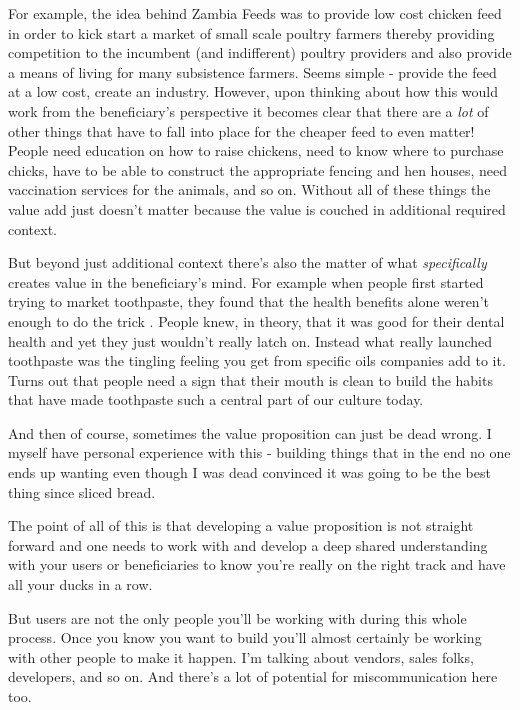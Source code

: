 \documentclass[11pt]{book}
\begin{document}
For example, the idea behind Zambia Feeds \cite{macmillan} was to provide low cost chicken feed in order to kick start a market of small scale poultry farmers thereby providing competition to the incumbent (and indifferent) poultry providers and also provide a means of living for many subsistence farmers. Seems simple - provide the feed at a low cost, create an industry. However, upon thinking about how this would work from the beneficiary's perspective it becomes clear that there are a \textit{lot} of other things that have to fall into place for the cheaper feed to even matter! People need education on how to raise chickens, need to know where to purchase chicks, have to be able to construct the appropriate fencing and hen houses, need vaccination services for the animals, and so on. Without all of these things the value add just doesn't matter because the value is couched in additional required context. 
\newline

But beyond just additional context there's also the matter of what \textit{specifically} creates value in the beneficiary's mind. For example when people first started trying to market toothpaste, they found that the health benefits alone weren't enough to do the trick \cite{duhigg}. People knew, in theory, that it was good for their dental health and yet they just wouldn't really latch on. Instead what really launched toothpaste was the tingling feeling you get from specific oils companies add to it. Turns out that people need a sign that their mouth is clean to build the habits that have made toothpaste such a central part of our culture today. 
\newline

And then of course, sometimes the value proposition can just be dead wrong. I myself have personal experience with this - building things that in the end no one ends up wanting even though I was dead convinced it was going to be the best thing since sliced bread.
\newline

The point of all of this is that developing a value proposition is not straight forward and one needs to work with and develop a deep shared understanding with your users or beneficiaries to know you're really on the right track and have all your ducks in a row.
\newline

But users are not the only people you'll be working with during this whole process. Once you know you want to build you'll almost certainly be working with other people to make it happen. I'm talking about vendors, sales folks, developers, and so on. And there's a lot of potential for miscommunication here too. 
\newline
\end{document}
